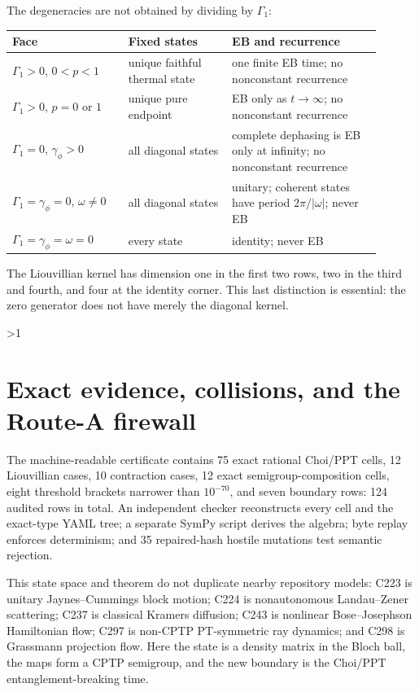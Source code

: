 \documentclass[10pt]{article}
\providecommand{\CRevisionRound}{2}
\begin{document}
The degeneracies are not obtained by dividing by $\Gamma_1$:
\begin{center}
\begin{tabular}{@{}>{\raggedright\arraybackslash}p{0.29\linewidth}>{\raggedright\arraybackslash}p{0.25\linewidth}>{\raggedright\arraybackslash}p{0.36\linewidth}@{}}
\toprule
Face & Fixed states & EB and recurrence\\
\midrule
$\Gamma_1>0$, $0<p<1$ & unique faithful thermal state & one finite EB time; no nonconstant recurrence\\
$\Gamma_1>0$, $p=0$ or $1$ & unique pure endpoint & EB only as $t\to\infty$; no nonconstant recurrence\\
$\Gamma_1=0$, $\gamma_\phi>0$ & all diagonal states & complete dephasing is EB only at infinity; no nonconstant recurrence\\
$\Gamma_1=\gamma_\phi=0$, $\omega\ne0$ & all diagonal states & unitary; coherent states have period $2\pi/|\omega|$; never EB\\
$\Gamma_1=\gamma_\phi=\omega=0$ & every state & identity; never EB\\
\bottomrule
\end{tabular}
\end{center}
The Liouvillian kernel has dimension one in the first two rows, two in the
third and fourth, and four at the identity corner.  This last distinction is
essential: the zero generator does not have merely the diagonal kernel.
\fi

\ifnum\CRevisionRound>1
\section{Exact evidence, collisions, and the Route-A firewall}
The machine-readable certificate contains 75 exact rational Choi/PPT cells,
12 Liouvillian cases, 10 contraction cases, 12 exact semigroup-composition
cells, eight threshold brackets narrower than $10^{-70}$, and seven boundary
rows: 124 audited rows in total.  An independent checker reconstructs every
cell and the exact-type YAML tree; a separate SymPy script derives the algebra;
byte replay enforces determinism; and 35 repaired-hash hostile mutations test
semantic rejection.

This state space and theorem do not duplicate nearby repository models:
C223 is unitary Jaynes--Cummings block motion; C224 is nonautonomous
Landau--Zener scattering; C237 is classical Kramers diffusion; C243 is
nonlinear Bose--Josephson Hamiltonian flow; C297 is non-CPTP PT-symmetric ray
dynamics; and C298 is Grassmann projection flow.  Here the state is a density
matrix in the Bloch ball, the maps form a CPTP semigroup, and the new boundary
is the Choi/PPT entanglement-breaking time.
\end{document}

